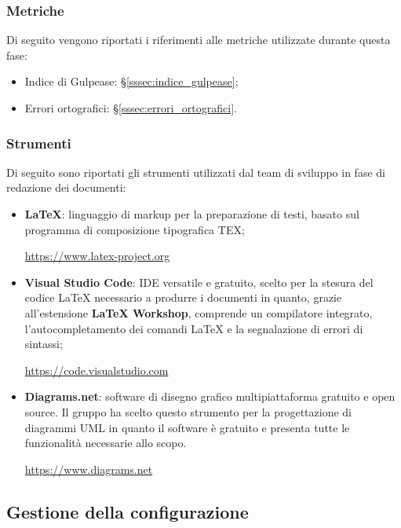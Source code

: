 \subsubsection{Metriche}
Di seguito vengono riportati i riferimenti alle metriche utilizzate durante questa fase:
\begin{itemize}
    \item Indice di Gulpease: §\ref{sssec:indice_gulpease};
    \item Errori ortografici: §\ref{sssec:errori_ortografici}.
\end{itemize}    
\subsubsection{Strumenti}
Di seguito sono riportati gli strumenti utilizzati dal team di sviluppo in fase di redazione dei documenti:
\begin{itemize}
    \item \textbf{\LaTeX}: linguaggio di markup per la preparazione di testi, basato sul programma di composizione tipografica TEX;
          \begin{center}\url{https://www.latex-project.org}\end{center}
    \item \textbf{Visual Studio Code}: IDE\glo{} versatile e gratuito, scelto per la stesura del codice \LaTeX\glo{} necessario a produrre i documenti in quanto, grazie all'estensione \textbf{LaTeX Workshop}, comprende un compilatore integrato, l'autocompletamento dei comandi \LaTeX \glo{} e la segnalazione di errori di sintassi;
          \begin{center}\url{https://code.visualstudio.com}\end{center}
    \item \textbf{Diagrams.net}: software di disegno grafico multipiattaforma gratuito e open source\glo{}. Il gruppo ha scelto questo strumento per la progettazione di diagrammi UML\glo{} in quanto il software è gratuito e presenta tutte le funzionalità necessarie allo scopo.
          \begin{center}\url{https://www.diagrams.net}\end{center}
\end{itemize}
\vspace{2cm}

\subsection{Gestione della configurazione}\label{subsection:gestione_configurazione}
